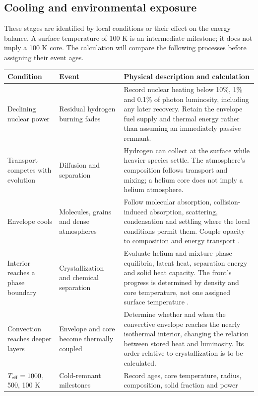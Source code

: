\clearpage
\subsection{Cooling and environmental exposure}
These stages are identified by local conditions or their effect on the energy
balance. A surface temperature of 100 K is an intermediate milestone; it
does not imply a 100 K core. The calculation will compare the following
processes before assigning their event ages.

{\small\renewcommand{\arraystretch}{1.16}
\begin{tabular}{@{}>{\raggedright\arraybackslash}p{}
 >{\raggedright\arraybackslash}p{}
 >{\raggedright\arraybackslash}p{}@{}}
\toprule
Condition & Event & Physical description and calculation \\\midrule
Declining nuclear power & Residual hydrogen burning fades &
Record nuclear heating below 10\%, 1\% and 0.1\% of photon luminosity,
including any later recovery. Retain the envelope fuel supply and thermal
energy rather than assuming an immediately passive remnant. \\[4pt]
Transport competes with evolution & Diffusion and separation &
Hydrogen can collect at the surface while heavier species settle. The
atmosphere's composition follows transport and mixing; a helium core does
not imply a helium atmosphere. \\[4pt]
Envelope cools & Molecules, grains and dense atmospheres &
Follow molecular absorption, collision-induced absorption, scattering,
condensation and settling where the local conditions permit them. Couple
opacity to composition and energy transport \cite{chabrier00,blouin18}. \\[4pt]
Interior reaches a phase boundary & Crystallization and chemical separation &
Evaluate helium and mixture phase equilibria, latent heat, separation energy
and solid heat capacity. The front's progress is determined by density and
core temperature, not one assigned surface temperature \cite{baiko22}. \\[4pt]
Convection reaches deeper layers & Envelope and core become thermally coupled &
Determine whether and when the convective envelope reaches the nearly
isothermal interior, changing the relation between stored heat and luminosity.
Its order relative to crystallization is to be calculated. \\[4pt]
$T_{\rm eff}=1000$, 500, 100 K & Cold-remnant milestones &
Record ages, core temperature, radius, composition, solid fraction and power

\end{tabular}}
